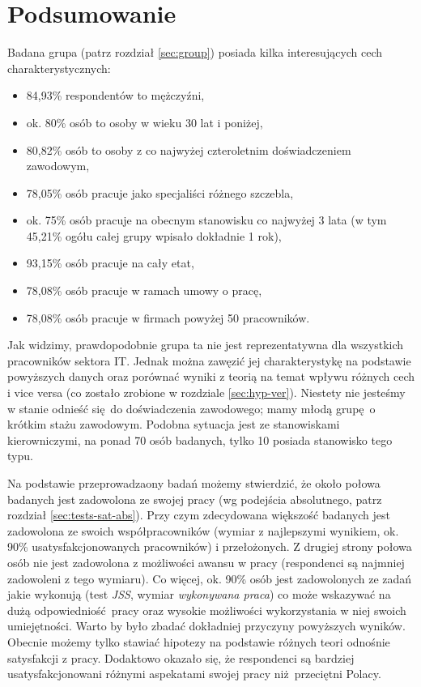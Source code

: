 \section{Podsumowanie}

Badana grupa (patrz rozdział \ref{sec:group}) posiada kilka interesujących cech charakterystycznych:
\begin{itemize}
  \item 84,93\% respondentów to mężczyźni,
  \item ok. 80\% osób to osoby w wieku 30 lat i poniżej,
  \item 80,82\% osób to osoby z co najwyżej czteroletnim doświadczeniem zawodowym,
  \item 78,05\% osób pracuje jako specjaliści różnego szczebla,
  \item ok. 75\% osób pracuje na obecnym stanowisku co najwyżej 3 lata (w tym 45,21\% ogółu całej grupy wpisało dokładnie 1 rok),
  \item 93,15\% osób pracuje na cały etat,
  \item 78,08\% osób pracuje w ramach umowy o pracę,
  \item 78,08\% osób pracuje w firmach powyżej 50 pracowników.
\end{itemize}
Jak widzimy, prawdopodobnie grupa ta nie jest reprezentatywna dla wszystkich pracowników sektora IT. Jednak można zawęzić jej charakterystykę na podstawie powyższych danych oraz porównać wyniki z teorią na temat wpływu różnych cech i vice versa (co zostało zrobione w rozdziale \ref{sec:hyp-ver}). Niestety nie jesteśmy w stanie odnieść się do doświadczenia zawodowego; mamy młodą grupę o krótkim stażu zawodowym. Podobna sytuacja jest ze stanowiskami kierowniczymi, na ponad 70 osób badanych, tylko 10 posiada stanowisko tego typu.

Na podstawie przeprowadzaony badań możemy stwierdzić, że około połowa badanych jest zadowolona ze swojej pracy (wg podejścia absolutnego, patrz rozdział \ref{sec:tests-sat-abs}). Przy czym zdecydowana większość badanych jest zadowolona ze swoich współpracowników (wymiar z najlepszymi wynikiem, ok. 90\% usatysfakcjonowanych pracowników) i przełożonych. Z drugiej strony połowa osób nie jest zadowolona z możliwości awansu w pracy (respondenci są
najmniej zadowoleni z tego wymiaru). Co więcej, ok. 90\% osób jest zadowolonych ze zadań jakie wykonują (test \emph{JSS}, wymiar \textit{wykonywana praca}) co może wskazywać na dużą odpowiedniość pracy oraz wysokie możliwości wykorzystania w niej swoich umiejętności. Warto by było zbadać dokładniej przyczyny powyższych wyników. Obecnie możemy tylko stawiać hipotezy na podstawie różnych teori odnośnie satysfakcji z pracy.  Dodaktowo okazało się, że respondenci są bardziej usatysfakcjonowani różnymi aspekatami swojej pracy niż przeciętni Polacy.

